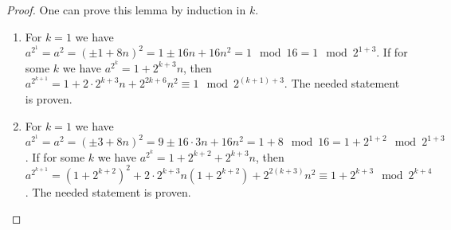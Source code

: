 \documentclass[10pt,a4paper]{amsart}
\begin{document}
\begin{proof} One can prove this lemma by induction in $k$.

\begin{enumerate}
 \item For $k=1$ we have $a^{2^1}=a^2= (\pm 1+ 8 n)^2= 1\pm 16 n+16n^2= 1\mod 16= 1\mod 2^{1+3}$. If for some $k$ we have $a^{2^k}=1 +2^{k+3} n$, then $a^{2^{k+1}}=1+ 2\cdot 2^{k+3}n + 2^{2k+6}n^2 \equiv 1\mod 2^{(k+1)+3}$. The needed statement is proven.


\item For $k=1$ we have $a^{2^1}=a^2= (\pm 3+ 8 n)^2= 9 \pm 16\cdot 3n +16n^2=1+ 8\mod 16= 1+ 2^{1+2} \mod 2^{1+3}$. If for some $k$ we have $a^{2^k}=1   +2^{k+2} +2^{k+3} n $, then $a^{2^{k+1}}=(1+2^{k+2})^2+ 2\cdot 2^{k+3}n (1+2^{k+2})  +2^{2(k+3)}n^2 \equiv 1 +2^{k+3}\mod 2^{k+4}$.  The needed statement is proven.

\end{enumerate}
\end{proof}
\end{document}
